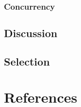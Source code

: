 \documentclass[10pt,letterpaper,onecolumn,draftclsnofoot]{IEEEtran}
\begin{document}
\subsubsection{Concurrency}

\subsection{Discussion}

\subsection{Selection}


\section{References}



\end{document}
